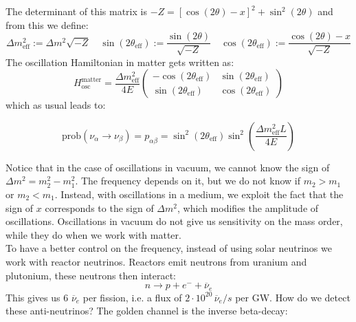 \documentclass[10.75pt,a4paper,openright,bottom=2cm]{article}
\newcommand{\beginbox}[1]{\begin{tcolorbox}[width=\textwidth,colback={black!40},title={#1},colbacktitle={purple!55},coltitle=black]}
\renewcommand{\endbox}{\end{tcolorbox}\noindent}
\begin{document}
The determinant of this matrix is $-Z=[\cos(2\theta)-x]^2+\sin^2(2\theta)$ and from this we define:
\[
\Delta m^2_{\text{eff}}:=\Delta m^2\sqrt{-Z} \quad \sin(2\theta_{\text{eff}}):=\frac{\sin(2\theta)}{\sqrt{-Z}} \quad \cos(2\theta_{\text{eff}}):=\frac{\cos(2\theta)-x}{\sqrt{-Z}}
\]
The oscillation Hamiltonian in matter gets written as:
\[
H_{\text{osc}}^{\text{matter}}=\frac{\Delta m^2_{\text{eff}}}{4E}\left(\begin{array}{cc}
    -\cos(2\theta_{\text{eff}}) & \sin(2\theta_{\text{eff}}) \\
    \sin(2\theta_{\text{eff}}) & \cos(2\theta_{\text{eff}})
\end{array}\right)
\]
which as usual leads to:
\beginbox{Oscillation Probability in Matter}
\[
\text{prob}(\nu_\alpha\to\nu_\beta)=p_{\alpha\beta}=\sin^2(2\theta_{\text{eff}})\sin^2\left(\frac{\Delta m^2_{\text{eff}}L}{4E}\right)
\]
\endbox
Notice that in the case of oscillations in vacuum, we cannot know the sign of $\Delta m^2=m_2^2-m_1^2$. The frequency depends on it, but we do not know if $m_2>m_1$ or $m_2<m_1$. Instead, with oscillations in a medium, we exploit the fact that the sign of $x$ corresponds to the sign of $\Delta m^2$, which modifies the amplitude of oscillations. Oscillations in vacuum do not give us sensitivity on the mass order, while they do when we work with matter.\\
To have a better control on the frequency, instead of using solar neutrinos we work with reactor neutrinos. Reactors emit neutrons from uranium and plutonium, these neutrons then interact:
\[
n\to p+e^-+\overline{\nu}_e
\]
This gives us 6 $\overline{\nu}_e$ per fission, i.e. a flux of $2\cdot10^{20}\,\overline{\nu}_e/s$ per GW. How do we detect these anti-neutrinos? The golden channel is the inverse beta-decay:
\end{document}
